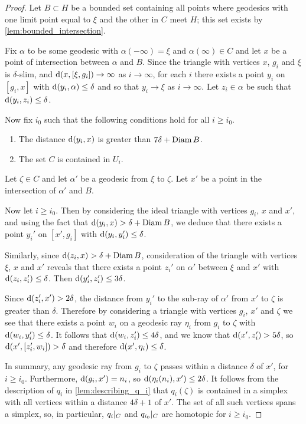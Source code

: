 \documentclass[a4paper]{article}
\begin{document}
\begin{proof}
  Let $B\subset H$ be a bounded set containing all points where geodesics with
  one limit point equal to $\xi$ and the other in $C$ meet $H$; this set exists
  by \cref{lem:bounded_intersection}.

  Fix $\alpha$ to be some geodesic with $\alpha(-\infty)=\xi$ and
  $\alpha(\infty)\in C$ and let $x$ be a point of intersection between $\alpha$
  and $B$. Since the triangle with vertices $x$, $g_i$ and $\xi$ is
  $\delta$-slim, and $\operatorname{d}(x, [\xi, g_i]) \to \infty$ as $i\to\infty$, for
  each $i$ there exists a point $y_i$ on $[g_i, x]$ with $\operatorname{d}(y_i, \alpha)
  \leq \delta$ and so that $y_i \to \xi$ as $i\to\infty$. Let $z_i \in \alpha$
  be such that $\operatorname{d}(y_i, z_i)\leq\delta$.
  
  Now fix $i_0$ such that the following conditions hold for all $i\geq 
  i_0$.
  \begin{enumerate}
    \item The distance $\operatorname{d}(y_i,x)$ is greater than $7\delta + \operatorname{Diam} B$.
    \item The set $C$ is contained in $U_i$.
  \end{enumerate}

  Let $\zeta \in C$ and let $\alpha'$ be a geodesic from $\xi$ to $\zeta$. Let 
  $x'$ be a point in the intersection of $\alpha'$ and $B$. 

  Now let $i\geq i_0$. Then by considering the ideal triangle with vertices
  $g_i$, $x$ and $x'$, and using the fact that $\operatorname{d}(y_i, x) > \delta + \operatorname{Diam}
  B$, we deduce that there exists a point $y_i'$ on $[x', g_i]$ with
  $\operatorname{d}(y_i, y_i') \leq \delta$.

  Similarly, since $\operatorname{d}(z_i, x) > \delta + \operatorname{Diam} B$, consideration of the
  triangle with vertices $\xi$, $x$ and $x'$ reveals that there exists a point
  $z_i'$ on $\alpha'$ between $\xi$ and $x'$ with $\operatorname{d}(z_i, z_i') \leq
  \delta$. Then $\operatorname{d}(y_i', z_i') \leq 3\delta$.

  Since $\operatorname{d}(z_i', x') > 2\delta$, the distance from $y_i'$ to the sub-ray of
  $\alpha'$ from $x'$ to $\zeta$ is greater than $\delta$. Therefore by
  considering a triangle with vertices $g_i$, $x'$ and $\zeta$ we see that
  there exists a point $w_i$ on a geodesic ray $\eta_i$ from $g_i$ to $\zeta$
  with $\operatorname{d}(w_i, y_i') \leq \delta$. It follows that $\operatorname{d}(w_i, z_i') \leq
  4\delta$, and we know that $\operatorname{d}(x', z_i') > 5\delta$, so $\operatorname{d}(x', [z_i',
  w_i]) > \delta$ and therefore $\operatorname{d}(x', \eta_i) \leq \delta$.

  In summary, any geodesic ray from $g_i$ to $\zeta$ passes within a distance 
  $\delta$ of $x'$, for $i\geq i_0$. Furthermore, $\operatorname{d}(g_i,x') = n_i$, so 
  $\operatorname{d}(\eta_i(n_i), x')\leq 2\delta$. It follows from the description of
  $q_i$ in \cref{lem:describing_q_i} that $q_i(\zeta)$ is contained in a
  simplex with all vertices within a distance $4\delta+1$ of $x'$. The set of
  all such vertices spans a simplex, so, in particular, $q_i\vert_{C}$ and
  $q_{i_0}\vert_{C}$ are homotopic for $i \geq i_0$. 
\end{proof}
\end{document}

